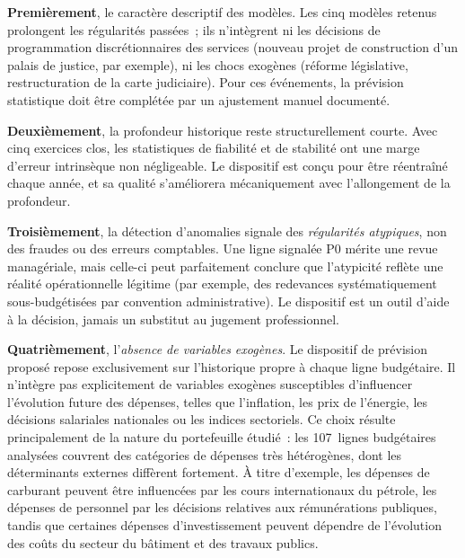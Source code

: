 \textbf{Premi\`erement}, le caract\`ere descriptif des mod\`eles. Les cinq
mod\`eles retenus prolongent les r\'egularit\'es pass\'ees~; ils
n'int\`egrent ni les d\'ecisions de programmation discr\'etionnaires des
services (nouveau projet de construction d'un palais de justice, par
exemple), ni les chocs exog\`enes (r\'eforme l\'egislative, restructuration
de la carte judiciaire). Pour ces \'ev\'enements, la pr\'evision statistique
doit \^etre compl\'et\'ee par un ajustement manuel document\'e.

\textbf{Deuxi\`emement}, la profondeur historique reste structurellement
courte. Avec cinq exercices clos, les statistiques de fiabilit\'e et de
stabilit\'e ont une marge d'erreur intrins\`eque non n\'egligeable. Le
dispositif est con\c{c}u pour \^etre r\'eentra\^in\'e chaque ann\'ee, et
sa qualit\'e s'am\'eliorera m\'ecaniquement avec l'allongement de la
profondeur.

\textbf{Troisi\`emement}, la d\'etection d'anomalies signale des
\emph{r\'egularit\'es atypiques}, non des fraudes ou des erreurs comptables.
Une ligne signal\'ee P0 m\'erite une revue manag\'eriale, mais celle-ci peut
parfaitement conclure que l'atypicit\'e refl\`ete une r\'ealit\'e
op\'erationnelle l\'egitime (par exemple, des redevances syst\'ematiquement
sous-budg\'etis\'ees par convention administrative). Le dispositif est un
outil d'aide \`a la d\'ecision, jamais un substitut au jugement professionnel.

\textbf{Quatri\`emement}, l'\textit{absence de variables exog\`enes}.
Le dispositif de pr\'evision propos\'e repose exclusivement sur l'historique
propre \`a chaque ligne budg\'etaire. Il n'int\`egre pas explicitement de
variables exog\`enes susceptibles d'influencer l'\'evolution future des
d\'epenses, telles que l'inflation, les prix de l'\'energie, les d\'ecisions
salariales nationales ou les indices sectoriels. Ce choix r\'esulte
principalement de la nature du portefeuille \'etudi\'e~: les 107~lignes
budg\'etaires analys\'ees couvrent des cat\'egories de d\'epenses tr\`es
h\'et\'erog\`enes, dont les d\'eterminants externes diff\`erent fortement.
\`A titre d'exemple, les d\'epenses de carburant peuvent \^etre influenc\'ees
par les cours internationaux du p\'etrole, les d\'epenses de personnel par
les d\'ecisions relatives aux r\'emun\'erations publiques, tandis que
certaines d\'epenses d'investissement peuvent d\'ependre de l'\'evolution
des co\^uts du secteur du b\^atiment et des travaux publics.

